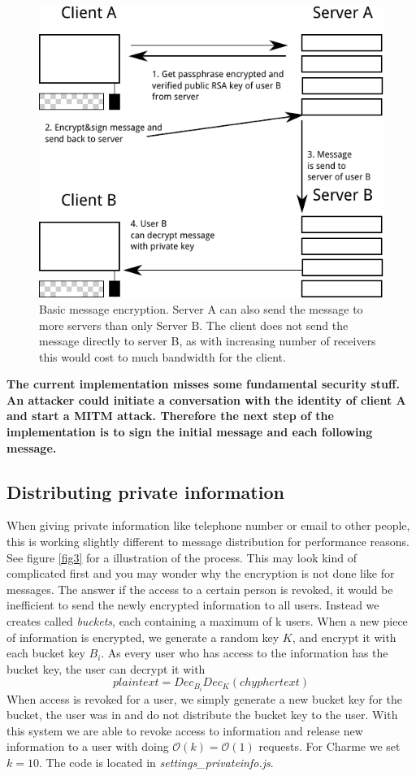 \documentclass{scrartcl}
\begin{document}
 \begin{figure}[ht]
	\centering
  \includegraphics[]{pubkey.pdf}
	\caption{Basic message encryption. Server A can also send the message to more servers than only Server B. The client does not send the message directly to server B, as with increasing number of receivers this would cost to much bandwidth for the client.}
	\label{fig2}
\end{figure}


\textbf{The current implementation misses some fundamental security stuff. An attacker could initiate a conversation with the identity of client A and start a MITM attack. Therefore the next step of the implementation is to sign the initial message and each following message.}

  \subsection{Distributing private information}
  When giving private information like telephone number or email to other people, this is working slightly different to message distribution for performance reasons. See figure \ref{fig3} for a illustration of the process. This may look kind of complicated first and you may wonder why the encryption is not done like for messages. The answer if the access to a certain person is revoked, it would be inefficient to send the newly encrypted information to all users. Instead we creates called \textit{buckets}, each containing a maximum of k users. When a new piece of information is encrypted, we generate a random key $K$, and encrypt it with each bucket key $B_i$. As every user who has access to the information has the bucket key, the user can decrypt it with
  $$
  plaintext = Dec_{B_i}{Dec_K(chyphertext)}
  $$
  When access is revoked for a user, we simply generate a new bucket key for the bucket, the user was in and do not distribute the bucket key to the user. With this system we are able to revoke access to information and release new information to a user with doing $\mathcal O(k) = \mathcal O(1)$ requests. For Charme we set $k = 10$. The code is located in \textit{settings\_privateinfo.js}.
  
\end{document}
